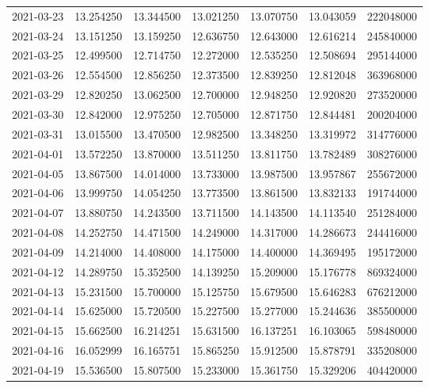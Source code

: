 \begin{tabular}{lrrrrrr}
2021-03-23 &   13.254250 &   13.344500 &   13.021250 &   13.070750 &   13.043059 &   222048000 \\
2021-03-24 &   13.151250 &   13.159250 &   12.636750 &   12.643000 &   12.616214 &   245840000 \\
2021-03-25 &   12.499500 &   12.714750 &   12.272000 &   12.535250 &   12.508694 &   295144000 \\
2021-03-26 &   12.554500 &   12.856250 &   12.373500 &   12.839250 &   12.812048 &   363968000 \\
2021-03-29 &   12.820250 &   13.062500 &   12.700000 &   12.948250 &   12.920820 &   273520000 \\
2021-03-30 &   12.842000 &   12.975250 &   12.705000 &   12.871750 &   12.844481 &   200204000 \\
2021-03-31 &   13.015500 &   13.470500 &   12.982500 &   13.348250 &   13.319972 &   314776000 \\
2021-04-01 &   13.572250 &   13.870000 &   13.511250 &   13.811750 &   13.782489 &   308276000 \\
2021-04-05 &   13.867500 &   14.014000 &   13.733000 &   13.987500 &   13.957867 &   255672000 \\
2021-04-06 &   13.999750 &   14.054250 &   13.773500 &   13.861500 &   13.832133 &   191744000 \\
2021-04-07 &   13.880750 &   14.243500 &   13.711500 &   14.143500 &   14.113540 &   251284000 \\
2021-04-08 &   14.252750 &   14.471500 &   14.249000 &   14.317000 &   14.286673 &   244416000 \\
2021-04-09 &   14.214000 &   14.408000 &   14.175000 &   14.400000 &   14.369495 &   195172000 \\
2021-04-12 &   14.289750 &   15.352500 &   14.139250 &   15.209000 &   15.176778 &   869324000 \\
2021-04-13 &   15.231500 &   15.700000 &   15.125750 &   15.679500 &   15.646283 &   676212000 \\
2021-04-14 &   15.625000 &   15.720500 &   15.227500 &   15.277000 &   15.244636 &   385500000 \\
2021-04-15 &   15.662500 &   16.214251 &   15.631500 &   16.137251 &   16.103065 &   598480000 \\
2021-04-16 &   16.052999 &   16.165751 &   15.865250 &   15.912500 &   15.878791 &   335208000 \\
2021-04-19 &   15.536500 &   15.807500 &   15.233000 &   15.361750 &   15.329206 &   404420000 \\

\end{tabular}
